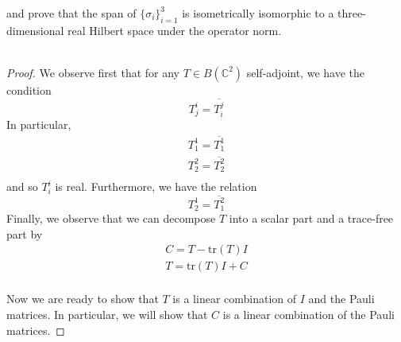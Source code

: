 \documentclass[fontsize=11pt]{scrartcl} %
\numberwithin{equation}{section} %
\numberwithin{figure}{section} %
\numberwithin{table}{section} %
\newcommand{\C}{\mathbb{C}}
\newcommand{\tr}{\textrm{tr}}
\begin{document}
and prove that the span of $\{\sigma_i\}_{i=1}^3$ is isometrically isomorphic to
a three-dimensional real Hilbert space under the operator norm.
\\
\\
\begin{proof}
    We observe first that for any $T\in B(\C^2)$ self-adjoint, we have the
    condition
    \[
        T^i_j = \overline{T^j_i}
    \]
    In particular,
    \[
        \begin{aligned}
            T^1_1 = \overline{T^1_1}\\
            T^2_2 = \overline{T^2_2}\\
        \end{aligned}
    \]
    and so $T^i_i$ is real. Furthermore, we have the relation
    \[
        T^1_2 = \overline{T^2_1}
    \]
    Finally, we observe that we can decompose $T$ into a scalar part and a
    trace-free part by
    \[
\begin{aligned}
    C = T-\tr(T)I\\
    T = \tr(T)I + C\\
\end{aligned}
    \]

    Now we are ready to show that $T$ is a linear combination of $I$ and the
    Pauli matrices. In particular, we will show that $C$ is a linear combination
    of the Pauli matrices.


\end{proof}
\end{document}
